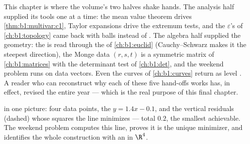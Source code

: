 \begin{remark}
\label{rem:b1:multivar:perspectives}
This chapter is where the volume's two halves shake hands. The
analysis half supplied its tools one  at a time: the
mean value theorem drives \cref{thm:b1:multivar:c1}, Taylor
expansions drive the extremum tests, and the $\varepsilon$'s of
\cref{ch:b1:topology} came back with balls instead of
. The algebra half supplied the geometry: the 
is read through the  of \cref{ch:b1:euclid}
(Cauchy--Schwarz makes it the steepest direction), the Monge
data $(r, s, t)$ is a symmetric matrix of
\cref{ch:b1:matrices} with the determinant test of
\cref{ch:b1:det}, and the weekend problem runs  on data vectors. Even the curves of
\cref{ch:b1:curves} return as level . A reader who can
reconstruct why each of these five hand-offs works has, in
effect, revised the entire year --- which is the real purpose
of this final chapter.
\end{remark}

\begin{omfigure}

{\small {} in one picture: four data points, the
 $y = 1.4x - 0.1$, and the vertical residuals
(dashed) whose squares the line minimizes --- total $0.2$, the
smallest achievable. The weekend problem computes this line,
proves it is the unique minimizer, and identifies the whole
construction with an  in $\R^4$.}
\end{omfigure}

